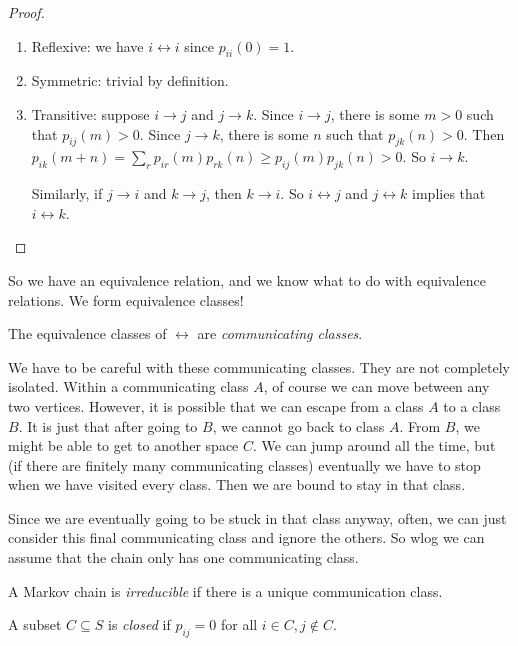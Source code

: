 \documentclass[a4paper]{article}
\begin{document}
\begin{proof}\leavevmode
  \begin{enumerate}
    \item Reflexive: we have $i \leftrightarrow i$ since $p_{ii}(0) = 1$.
    \item Symmetric: trivial by definition.
    \item Transitive: suppose $i \to j$ and $j \to k$. Since $i \to j$, there is some $m > 0$ such that $p_{ij}(m) > 0$. Since $j \to k$, there is some $n$ such that $p_{jk}(n) > 0$. Then $p_{ik}(m + n) = \sum_{r} p_{ir}(m)p_{r k}(n) \geq p_{ij}(m)p_{jk}(n) > 0$. So $i \to k$.

      Similarly, if $j \to i$ and $k \to j$, then $k \to i$. So $i \leftrightarrow j$ and $j \leftrightarrow k$ implies that $i \leftrightarrow k$.
  \end{enumerate}
\end{proof}
So we have an equivalence relation, and we know what to do with equivalence relations. We form equivalence classes!
\begin{defi}
  The equivalence classes of $\leftrightarrow$ are \emph{communicating classes}.
\end{defi}
We have to be careful with these communicating classes. They are not completely isolated. Within a communicating class $A$, of course we can move between any two vertices. However, it is possible that we can escape from a class $A$ to a class $B$. It is just that after going to $B$, we cannot go back to class $A$. From $B$, we might be able to get to another space $C$. We can jump around all the time, but (if there are finitely many communicating classes) eventually we have to stop when we have visited every class. Then we are bound to stay in that class.

Since we are eventually going to be stuck in that class anyway, often, we can just consider this final communicating class and ignore the others. So wlog we can assume that the chain only has one communicating class.

\begin{defi}
  A Markov chain is \emph{irreducible} if there is a unique communication class.
\end{defi}

\begin{defi}[Closed]
  A subset $C\subseteq S$ is \emph{closed} if $p_{ij} = 0$ for all $i \in C, j\not\in C$.
\end{defi}
\end{document}

